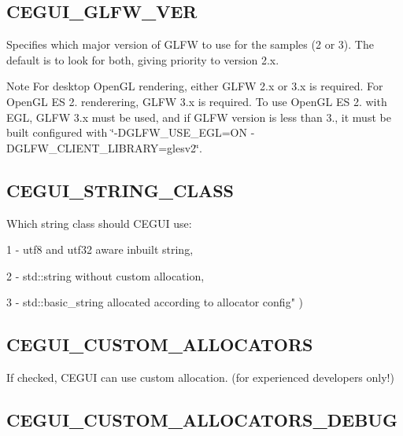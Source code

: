 \hypertarget{build_options_build_options_glfw_ver}{}\subsection{C\+E\+G\+U\+I\+\_\+\+G\+L\+F\+W\+\_\+\+V\+ER}\label{build_options_build_options_glfw_ver}
Specifies which major version of G\+L\+FW to use for the samples (2 or 3). The default is to look for both, giving priority to version 2.\+x. \begin{DoxyNote}{Note}
For desktop Open\+GL rendering, either G\+L\+FW 2.\+x or 3.\+x is required. For Open\+GL ES 2. renderering, G\+L\+FW 3.\+x is required. To use Open\+GL ES 2. with E\+GL, G\+L\+FW 3.\+x must be used, and if G\+L\+FW version is less than 3., it must be built configured with \char`\"{}-\/\+D\+G\+L\+F\+W\+\_\+\+U\+S\+E\+\_\+\+E\+G\+L=\+O\+N -\/\+D\+G\+L\+F\+W\+\_\+\+C\+L\+I\+E\+N\+T\+\_\+\+L\+I\+B\+R\+A\+R\+Y=glesv2\char`\"{}. 
\end{DoxyNote}
\hypertarget{build_options_build_options_string_class}{}\subsection{C\+E\+G\+U\+I\+\_\+\+S\+T\+R\+I\+N\+G\+\_\+\+C\+L\+A\+SS}\label{build_options_build_options_string_class}
Which string class should C\+E\+G\+UI use\+:
\begin{DoxyItemize}
\item 1 -\/ utf8 and utf32 aware inbuilt string,
\item 2 -\/ std\+::string without custom allocation,
\item 3 -\/ std\+::basic\+\_\+string allocated according to allocator config" ) 
\end{DoxyItemize}\hypertarget{build_options_build_options_custom_allocators}{}\subsection{C\+E\+G\+U\+I\+\_\+\+C\+U\+S\+T\+O\+M\+\_\+\+A\+L\+L\+O\+C\+A\+T\+O\+RS}\label{build_options_build_options_custom_allocators}
If checked, C\+E\+G\+UI can use custom allocation. (for experienced developers only!) \hypertarget{build_options_build_options_allocators_debug}{}\subsection{C\+E\+G\+U\+I\+\_\+\+C\+U\+S\+T\+O\+M\+\_\+\+A\+L\+L\+O\+C\+A\+T\+O\+R\+S\+\_\+\+D\+E\+B\+UG}\label{build_options_build_options_allocators_debug}
